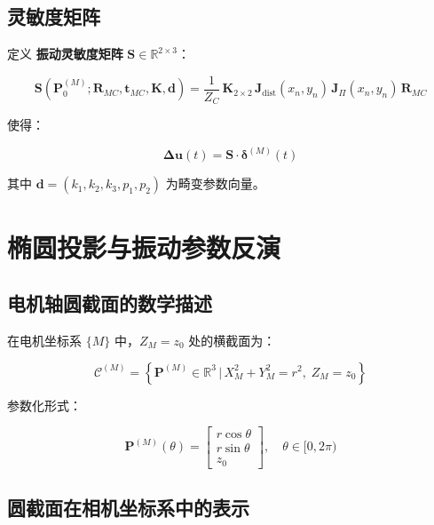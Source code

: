 \documentclass[12pt,a4paper]{article}
\begin{document}
\subsection{灵敏度矩阵}

定义 \textbf{振动灵敏度矩阵} $\mathbf{S} \in \mathbb{R}^{2 \times 3}$：

\begin{equation}
\boxed{
\mathbf{S}(\mathbf{P}_0^{(M)}; \mathbf{R}_{MC}, \mathbf{t}_{MC}, \mathbf{K}, \mathbf{d})
=
\frac{1}{Z_C}
\,
\mathbf{K}_{2\times 2}
\,
\mathbf{J}_{\text{dist}}(x_n, y_n)
\,
\mathbf{J}_{\Pi}(x_n, y_n)
\,
\mathbf{R}_{MC}
}
\label{eq:sensitivity_matrix}
\end{equation}

使得：

\begin{equation}
\boxed{
\mathbf{\Delta u}(t) = \mathbf{S} \cdot \boldsymbol{\delta}^{(M)}(t)
}
\label{eq:sensitivity_relation}
\end{equation}

其中 $\mathbf{d} = (k_1, k_2, k_3, p_1, p_2)$ 为畸变参数向量。

\section{椭圆投影与振动参数反演}

\subsection{电机轴圆截面的数学描述}

在电机坐标系 $\{M\}$ 中，$Z_M = z_0$ 处的横截面为：

\begin{equation}
\mathcal{C}^{(M)} = \left\{
\mathbf{P}^{(M)} \in \mathbb{R}^3 \,\Big|\,
X_M^2 + Y_M^2 = r^2,\; Z_M = z_0
\right\}
\label{eq:circle_cross_section}
\end{equation}

参数化形式：

\begin{equation}
\mathbf{P}^{(M)}(\theta) =
\begin{bmatrix}
r \cos\theta \\[2pt]
r \sin\theta \\[2pt]
z_0
\end{bmatrix},
\quad \theta \in [0, 2\pi)
\label{eq:circle_parameterization}
\end{equation}

\subsection{圆截面在相机坐标系中的表示}
\end{document}
